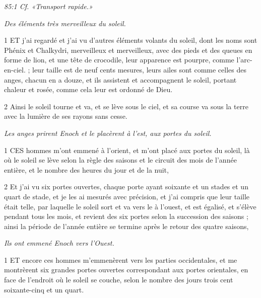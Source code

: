 \par \textit{85:1 Cf. «Transport rapide.»}


\par \textit{Des éléments très merveilleux du soleil.}

\par 1 ET j'ai regardé et j'ai vu d'autres éléments volants du soleil, dont les noms sont Phénix et Chalkydri, merveilleux et merveilleux, avec des pieds et des queues en forme de lion, et une tête de crocodile, leur apparence est pourpre, comme l'arc-en-ciel. ; leur taille est de neuf cents mesures, leurs ailes sont comme celles des anges, chacun en a douze, et ils assistent et accompagnent le soleil, portant chaleur et rosée, comme cela leur est ordonné de Dieu.

\par 2 Ainsi le soleil tourne et va, et se lève sous le ciel, et sa course va sous la terre avec la lumière de ses rayons sans cesse.


\par \textit{Les anges prirent Enoch et le placèrent à l'est, aux portes du soleil.}

\par 1 CES hommes m'ont emmené à l'orient, et m'ont placé aux portes du soleil, là où le soleil se lève selon la règle des saisons et le circuit des mois de l'année entière, et le nombre des heures du jour et de la nuit,

\par 2 Et j'ai vu six portes ouvertes, chaque porte ayant soixante et un stades et un quart de stade, et je les ai mesurés avec précision, et j'ai compris que leur taille était telle, par laquelle le soleil sort et va vers le à l'ouest, et est égalisé, et s'élève pendant tous les mois, et revient des six portes selon la succession des saisons ; ainsi la période de l'année entière se termine après le retour des quatre saisons,


\par \textit{Ils ont emmené Enoch vers l'Ouest.}

\par 1 ET encore ces hommes m'emmenèrent vers les parties occidentales, et me montrèrent six grandes portes ouvertes correspondant aux portes orientales, en face de l'endroit où le soleil se couche, selon le nombre des jours trois cent soixante-cinq et un quart.

